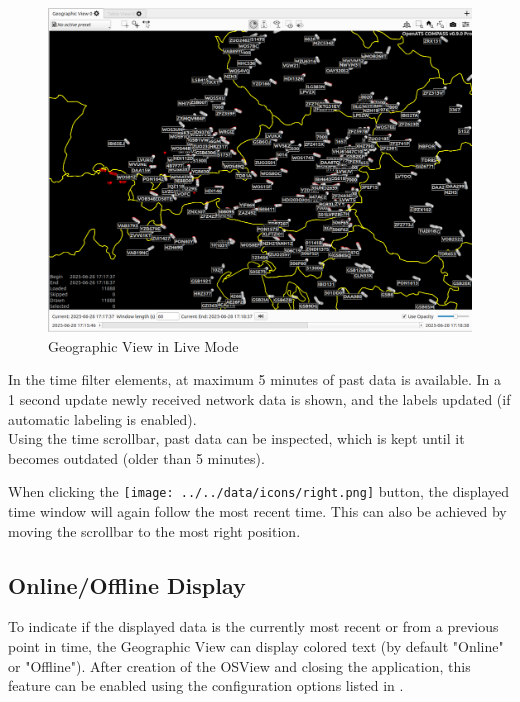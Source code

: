 \begin{figure}[H]
    \hspace*{-2.5cm}
    \includegraphics[width=19cm,frame]{figures/geo_live_mode.png}
  \caption{Geographic View in Live Mode}
\end{figure} 

In the time filter elements, at maximum 5 minutes of past data is available. In a 1 second update newly received network data is shown, and the labels updated (if automatic labeling is enabled). \\

Using the time scrollbar, past data can be inspected, which is kept until it becomes outdated (older than 5 minutes).

When clicking the \texttt{[image: ../../data/icons/right.png]} button, the displayed time window will again follow the most recent time. This can also be achieved by moving the scrollbar to the most right position.

\subsection{Online/Offline Display}

To indicate if the displayed data is the currently most recent or from a previous point in time, the Geographic View can display colored text (by default "Online" or "Offline"). After creation of the OSView and closing the application, this feature can be enabled using the configuration options listed in .

